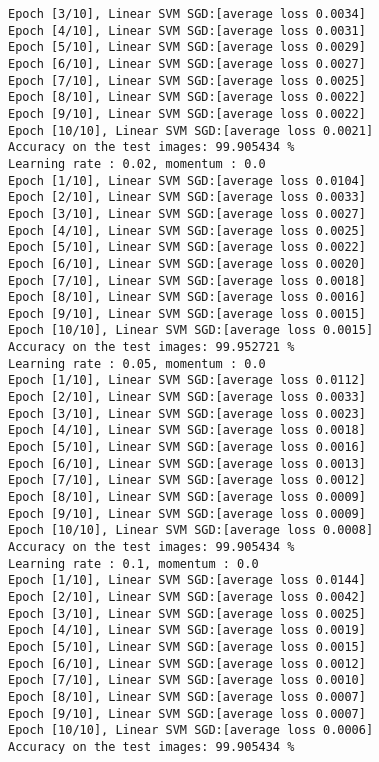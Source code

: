 \documentclass[10pt]{article}
\newcommand{\0}{{\mathbf{0}}}
\newcommand{\1}{{\mathbf{1}}}
\begin{document}
\begin{verbatim}
Epoch [3/10], Linear SVM SGD:[average loss 0.0034]
Epoch [4/10], Linear SVM SGD:[average loss 0.0031]
Epoch [5/10], Linear SVM SGD:[average loss 0.0029]
Epoch [6/10], Linear SVM SGD:[average loss 0.0027]
Epoch [7/10], Linear SVM SGD:[average loss 0.0025]
Epoch [8/10], Linear SVM SGD:[average loss 0.0022]
Epoch [9/10], Linear SVM SGD:[average loss 0.0022]
Epoch [10/10], Linear SVM SGD:[average loss 0.0021]
Accuracy on the test images: 99.905434 %
Learning rate : 0.02, momentum : 0.0
Epoch [1/10], Linear SVM SGD:[average loss 0.0104]
Epoch [2/10], Linear SVM SGD:[average loss 0.0033]
Epoch [3/10], Linear SVM SGD:[average loss 0.0027]
Epoch [4/10], Linear SVM SGD:[average loss 0.0025]
Epoch [5/10], Linear SVM SGD:[average loss 0.0022]
Epoch [6/10], Linear SVM SGD:[average loss 0.0020]
Epoch [7/10], Linear SVM SGD:[average loss 0.0018]
Epoch [8/10], Linear SVM SGD:[average loss 0.0016]
Epoch [9/10], Linear SVM SGD:[average loss 0.0015]
Epoch [10/10], Linear SVM SGD:[average loss 0.0015]
Accuracy on the test images: 99.952721 %
Learning rate : 0.05, momentum : 0.0
Epoch [1/10], Linear SVM SGD:[average loss 0.0112]
Epoch [2/10], Linear SVM SGD:[average loss 0.0033]
Epoch [3/10], Linear SVM SGD:[average loss 0.0023]
Epoch [4/10], Linear SVM SGD:[average loss 0.0018]
Epoch [5/10], Linear SVM SGD:[average loss 0.0016]
Epoch [6/10], Linear SVM SGD:[average loss 0.0013]
Epoch [7/10], Linear SVM SGD:[average loss 0.0012]
Epoch [8/10], Linear SVM SGD:[average loss 0.0009]
Epoch [9/10], Linear SVM SGD:[average loss 0.0009]
Epoch [10/10], Linear SVM SGD:[average loss 0.0008]
Accuracy on the test images: 99.905434 %
Learning rate : 0.1, momentum : 0.0
Epoch [1/10], Linear SVM SGD:[average loss 0.0144]
Epoch [2/10], Linear SVM SGD:[average loss 0.0042]
Epoch [3/10], Linear SVM SGD:[average loss 0.0025]
Epoch [4/10], Linear SVM SGD:[average loss 0.0019]
Epoch [5/10], Linear SVM SGD:[average loss 0.0015]
Epoch [6/10], Linear SVM SGD:[average loss 0.0012]
Epoch [7/10], Linear SVM SGD:[average loss 0.0010]
Epoch [8/10], Linear SVM SGD:[average loss 0.0007]
Epoch [9/10], Linear SVM SGD:[average loss 0.0007]
Epoch [10/10], Linear SVM SGD:[average loss 0.0006]
Accuracy on the test images: 99.905434 %
\end{verbatim}
\end{document}
